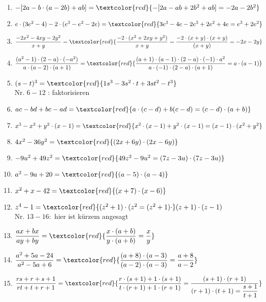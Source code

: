\documentclass[11pt, a4paper, twoside, fleqn]{article}
\begin{document}
\begin{enumerate}[itemsep=3ex , leftmargin=*]
\item $ -[2a - b \cdot (a - 2b) +ab] = \textcolor{red}{-[2a - ab + 2b^{2} +ab] = -2a - 2b^{2}} $ 
\item $ e \cdot (3e^{2} - 4) -2 \cdot (e^{3} - e^{2} - 2e) = \textcolor{red}{3e^{3} - 4e - 2e^{3} + 2e^{2} + 4e = e^{3} + 2e^{2}} $
\item $ \dfrac{-2x^{2} - 4xy - 2y^{2}}{x+y} = \textcolor{red}{\dfrac{-2 \cdot (x^{2} + 2xy + y^{2})}{x+y} = \dfrac{-2 \cdot(x + y) \cdot (x + y)}{(x + y)} = -2x - 2y} $
\item $ \dfrac{(a^{2} - 1) \cdot (2 - a) \cdot (-a^{2})}{a \cdot (a - 2) \cdot (a + 1)} = \textcolor{red}{\dfrac{(a + 1) \cdot (a - 1) \cdot (2 - a) \cdot (-1) \cdot a^{2}}{a \cdot (-1) \cdot (2 - a) \cdot (a + 1)} = a \cdot (a - 1)}  $
\item $ (s - t)^{3} = \textcolor{red}{1s^{3} - 3s^{2} \cdot t + 3st^{2} - t^{3}} $ \\
Nr. $ 6-12 $ : faktorisieren
\item $ ac - bd +bc - ad = \textcolor{red}{a \cdot (c - d) +b (c-d) = (c - d) \cdot (a + b)} $
\item $ x^{3} - x^{2} + y^{2} \cdot (x - 1) = \textcolor{red}{x^{2} \cdot (x - 1) + y^{2} \cdot (x - 1) = (x - 1) \cdot (x^{2} + y^{2}} $
\item $ 4x^{2} - 36y^{2} = \textcolor{red}{(2x + 6y) \cdot (2x - 6y)} $
\item $ -9u^{2} + 49z^{2} = \textcolor{red}{49z^{2} - 9u^{2} = (7z - 3u) \cdot (7z - 3u) } $
\item $ a^{2} - 9a + 20 = \textcolor{red}{(a- 5) \cdot (a - 4)} $
\item $ x^{2} + x - 42 = \textcolor{red}{(x + 7) \cdot (x - 6)} $
\item $ z^{4} - 1 = \textcolor{red}{(z^{2} + 1) \cdot (z^{2} = (z^{2} + 1) \cdot} (z + 1) \cdot (z - 1) $ \\ 
Nr. $ 13 -16:$ hier ist kürzem angesagt
\item $ \dfrac{ax + bx}{ay + by} = \textcolor{red}{\dfrac{x \cdot (a+b)}{y \cdot (a+b)} = \dfrac{x}{y}} $
\item $ \dfrac{a^{2} + 5a -24}{a^{2} - 5a + 6} = \textcolor{red}{\dfrac{(a + 8) \cdot (a - 3)}{(a - 2) \cdot (a-3)} = \dfrac{a + 8}{a - 2}} $
\item $ \dfrac{rs + r + s + 1}{rt + t +r + 1} = \textcolor{red}{\dfrac{r \cdot (s + 1) + 1 \cdot(s + 1)}{t \cdot(r + 1) +1 \cdot (r + 1)} = \dfrac{(s + 1) \cdot (r + 1)}{(r + 1) \cdot (t + 1) = \dfrac{s + 1}{t + 1}}} $

\end{enumerate}
\end{document}
